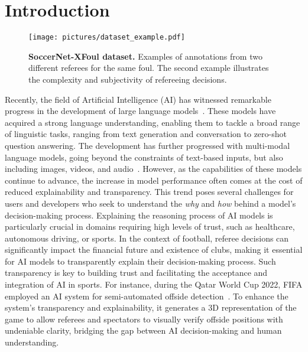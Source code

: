 \section{Introduction}
\label{sec:intro}

\begin{figure}[t]
    \centering
    \texttt{[image: pictures/dataset\_example.pdf]}
    \caption{\textbf{SoccerNet-XFoul dataset.} 
Examples of annotations from two different referees for the same foul.
   The second example illustrates the complexity and subjectivity of refereeing decisions. %
    }
    \label{fig:dataset_example}
\end{figure}

Recently, the field of Artificial Intelligence (AI) has witnessed remarkable progress in the development of large language models~\cite{Touvron2023LLaMA-arxiv, Brown2020Language-arxiv, Devlin2018BERT-arxiv, Hoffmann2022Training-arxiv, Chowdhery2022PaLM-arxiv}.
These models have acquired a strong language understanding, enabling them to tackle a broad range of linguistic tasks, ranging from text generation and conversation to zero-shot question answering.
The development has further progressed with multi-modal language models, going beyond the constraints of text-based inputs, but also including images, videos, and audio~\cite{Zhu2023MiniGPT4-arxiv, Maaz2023VideoChatGPT-arxiv, Ye2023mPLUGOwl2-arxiv, Alayrac2022Flamingo-arxiv}.
However, as the capabilities of these models continue to advance, the increase in model performance often comes at the cost of reduced explainability and transparency. 
This trend poses several challenges for users and developers who seek to understand the \textit{why} and \textit{how} behind a model's decision-making process. 
Explaining the reasoning process of AI models is particularly crucial in domains requiring high levels of trust, such as healthcare, autonomous driving, or sports.
In the context of football, referee decisions can significantly impact the financial future and existence of clubs, making it essential for AI models to transparently explain their decision-making process. Such transparency is key to building trust and facilitating the acceptance and integration of AI in sports.
For instance, during the Qatar World Cup 2022, FIFA employed an AI system for semi-automated offside detection~\cite{FIFA2023SemiAutomatedOffsideTechnology}.
To enhance the system's transparency and explainability, it generates a 3D representation of the game to allow referees and spectators to visually verify offside positions with undeniable clarity, bridging the gap between AI decision-making and human understanding.

